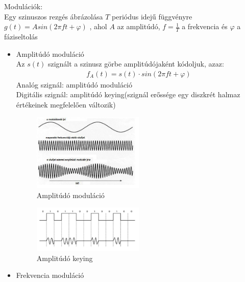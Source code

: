 \documentclass[margin=0px]{article}
\begin{document}
\begin{description}
\begin{itemize}
                  Modulációk:\\
                  Egy szinuszos rezgés ábrázolása $T$ periódus idejű függvényre $g(t)=Asin(2\pi f t + \varphi)$ , ahol $A$ az amplitúdó, $f = \frac{1}{T}$ a frekvencia és $\varphi $ a fáziseltolás
                  \begin{itemize}
                      \item Amplitúdó moduláció \\
                            Az $s(t)$ szignált a szinusz görbe amplitúdójaként kódoljuk, azaz:
                            \begin{align*}
                                f_A(t) = s(t) \cdot sin(2\pi f t + \varphi)
                            \end{align*}
                            Analóg szignál: amplitúdó moduláció\\
                            Digitális szignál: amplitúdó keying(szignál erőssége egy diszkrét halmaz értékeinek megfelelően változik)
                            \begin{figure}[H]
                                \centering
                                \includegraphics[width=0.5\textwidth]{img/amplitudo_mod.png}
                                \caption{Amplitúdó moduláció}
                            \end{figure}
                            \begin{figure}[H]
                                \centering
                                \includegraphics[width=0.5\textwidth]{img/amplitudo_key.png}
                                \caption{Amplitúdó keying}
                            \end{figure}
                      \item Frekvencia moduláció \\

\end{itemize}
\end{itemize}
\end{description}
\end{document}
